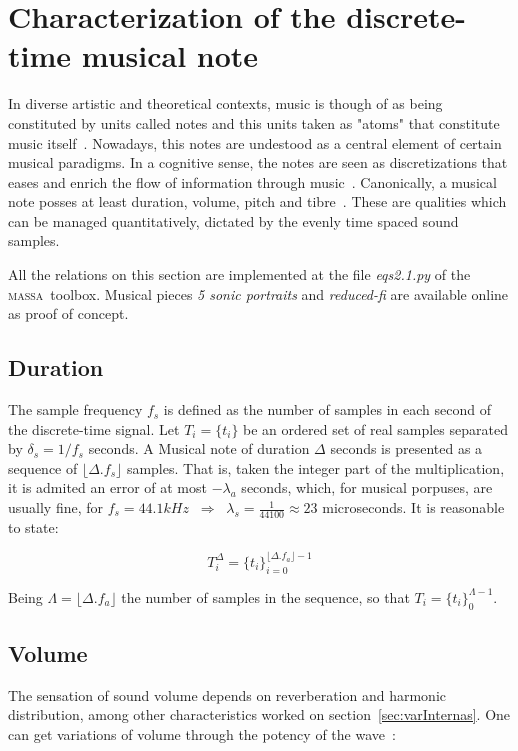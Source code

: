 \documentclass[
 aip,
 jmp,
 amsmath,amssymb,
 reprint,
]{revtex4-1}
\newcommand{\massa}{{\large \textsc{massa}}}
\begin{document}
\section{Characterization of the discrete-time musical note}
In diverse artistic and theoretical contexts, music is though of as being constituted by units called notes and this units taken as "atoms" that constitute music itself~\cite{Wisnick, Lovelock, Webern}.
Nowadays, this notes are undestood as a central element of certain musical paradigms. In a cognitive sense, the notes are seen as discretizations that eases and enrich the flow of information through music~\cite{Roederer, Lacerda}.
Canonically, a musical note posses at least duration, volume, pitch and tibre~\cite{Lacerda}. These are qualities which can be managed quantitatively, dictated by the evenly time spaced sound samples.

All the relations on this section are implemented at the file \emph{eqs2.1.py} of the \massa\ toolbox. Musical pieces \emph{5 sonic portraits} and \emph{reduced-fi} are available online as proof of concept.

\subsection{Duration}
The sample frequency $f_s$ is defined as the number of samples in each second of the discrete-time signal. Let $T_i=\{t_i\}$ be an ordered set of real samples separated by $\delta_s=1/f_s$ seconds. A Musical note of duration $\Delta$ seconds is presented as a sequence of $\lfloor \Delta . f_s \rfloor $ samples. That is, taken the integer part of the multiplication, it is admited an error of at most $-\lambda_a$ seconds, which, for musical porpuses, are usually fine, for $f_s=44.1kHz \;\;\Rightarrow\;\;\lambda_s=\frac{1}{44100}\approx 23$ microseconds. It is reasonable to state:


\begin{equation}\label{eq:dur}
T_{i}^{\Delta}={\{t_i\}}_{i=0}^{\lfloor \Delta . f_a \rfloor -1}
\end{equation}

Being $\Lambda=\lfloor \Delta . f_a \rfloor$ the number of samples in the sequence, so that $T_i=\{t_i\}_0^{\Lambda-1}$.

\subsection{Volume}\label{subsec:volume}
The sensation of sound volume depends on reverberation and harmonic distribution, among other characteristics worked on section~\ref{sec:varInternas}. One can get variations of volume through the potency of the wave~\cite{Chowning}:
\end{document}
